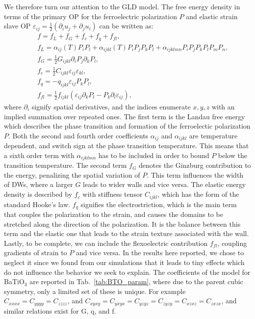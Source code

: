 We therefore turn our attention to the GLD model.
The free energy density in terms of the primary OP for the ferroelectric polarization $P$ and elastic strain slave OP $\varepsilon_{ij} = \frac{1}{2}(\partial_i u_j + \partial_j u_i)$ can be written as:
\begin{eqnarray}\label{eq:BTO_energy}
&&f = f_{L}+f_{G}+f_{c}+f_{q}+f_{fl},\\
&&f_{L} = \alpha_{ij}(T)P_iP_l + \alpha_{ijkl}(T)P_{i}P_{j}P_{k}P_{l} + \alpha_{ijklmn} P_i P_j P_k P_l P_m P_n,\\
&&f_{G} = \frac{1}{2}G_{ijkl}\partial_i P_j\partial_k P_l,\\
&&f_{c} = \frac{1}{2}C_{ijkl}\varepsilon_{ij}\varepsilon_{kl},\\
&&f_{q}= - q_{ijkl}\varepsilon_{ij}P_{k}P_{l},\\
&&f_{fl}=\frac{1}{2}f_{ijkl}(\varepsilon_{ij}\partial_k P_l - P_k\partial_l\varepsilon_{ij}),
\end{eqnarray}
where $\partial_i$ signify spatial derivatives, and the indices enumerate ${x,y,z}$ with an implied summation over repeated ones.
The first term is the Landau free energy which describes the phase transition and formation of the ferroelectic polarization $P$.
Both the second and fourth order coefficients $\alpha_{ij}$ and $\alpha_{ijkl}$ are temperature dependent, and switch sign at the phase transition temperature.
This means that a sixth order term with $\alpha_{ijklmn}$ has to be included in order to bound $P$ below the transition temperature.
The second term $f_G$ denotes the Ginzburg contribution to the energy, penalizing the spatial variation of $P$.  
This term influences the width of DWs, where a larger $G$ leads to wider walls and vice versa.
The elastic energy density is described by $f_c$ with stiffness tensor $C_{ijkl}$, which has the form of the standard Hooke's law.
$f_q$ signifies the electrostriction, which is the main term that couples the polarization to the strain, and causes the domains to be stretched along the direction of the polarization.
It is the balance between this term and the elastic one that leads to the strain texture associated with the wall.
Lastly, to be complete, we can include the flexoelectric contribution $f_{fl}$, coupling gradients of strain to $P$ and vice versa.
In the results here reported, we chose to neglect it since we found from our simulations that it leads to tiny effects which do not influence the behavior we seek to explain.
The coefficients of the model for BaTiO$_3$ are reported in Tab.~\ref{tab:BTO_param}, where due to the parent cubic symmetry, only a limited set of these is unique.
For example $C_{xxxx} = C_{yyyy} = C_{zzzz}$, and $C_{xyxy} = C_{yxyx} = C_{yzyz} = C_{zyzy} = C_{xzxz} = C_{zxzx}$, and similar relations exist for G, q, and f. 

